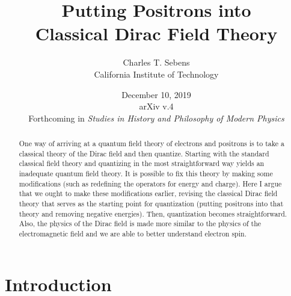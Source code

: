 \documentclass[12pt,secnumarabic,amsmath,amssymb,balancelastpage,nofootinbib]{article}
\begin{document}
\sloppy %




\title{\vspace*{-35 pt}\Huge{Putting Positrons into\\Classical Dirac Field Theory}}
\author{Charles T. Sebens\\California Institute of Technology}
\date{December 10, 2019\\ arXiv v.4\\\vspace{10 pt}Forthcoming in \emph{Studies in History and Philosophy of Modern Physics}}


\maketitle
\vspace*{-20 pt}
\begin{abstract}
One way of arriving at a quantum field theory of electrons and positrons is to take a classical theory of the Dirac field and then quantize.  Starting with the standard classical field theory and quantizing in the most straightforward way yields an inadequate quantum field theory.  It is possible to fix this theory by making some modifications (such as redefining the operators for energy and charge).  Here I argue that we ought to make these modifications earlier, revising the classical Dirac field theory that serves as the starting point for quantization (putting positrons into that theory and removing negative energies).  Then, quantization becomes straightforward.  Also, the physics of the Dirac field is made more similar to the physics of the electromagnetic field and we are able to better understand electron spin.
\end{abstract}

\newpage
\tableofcontents
\newpage


\section{Introduction}\label{introsec}
\end{document}
